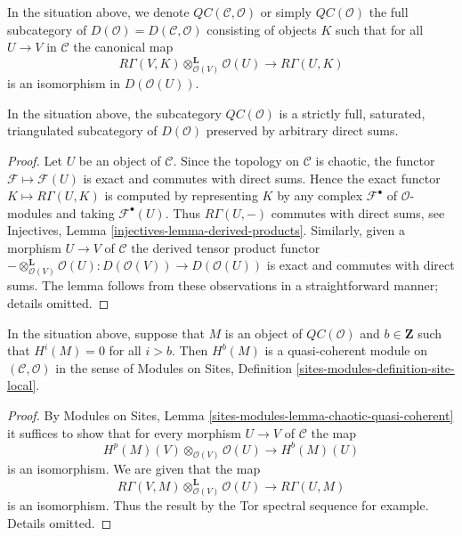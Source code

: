 \begin{definition}
\label{definition-cartesian}
In the situation above, we denote $\mathit{QC}(\mathcal{C}, \mathcal{O})$
or simply {\it $\mathit{QC}(\mathcal{O})$}
the full subcategory of $D(\mathcal{O}) = D(\mathcal{C}, \mathcal{O})$
consisting of objects $K$ such that
for all $U \to V$ in $\mathcal{C}$ the canonical map
$$
R\Gamma(V, K) \otimes_{\mathcal{O}(V)}^\mathbf{L} \mathcal{O}(U)
\longrightarrow
R\Gamma(U, K)
$$
is an isomorphism in $D(\mathcal{O}(U))$.
\end{definition}

\begin{lemma}
\label{lemma-cartesian-good-sub}
In the situation above, the subcategory $\mathit{QC}(\mathcal{O})$ is a
strictly full, saturated, triangulated subcategory of $D(\mathcal{O})$
preserved by arbitrary direct sums.
\end{lemma}

\begin{proof}
Let $U$ be an object of $\mathcal{C}$. Since the topology
on $\mathcal{C}$ is chaotic, the functor $\mathcal{F} \mapsto \mathcal{F}(U)$
is exact and commutes with direct sums. Hence the exact functor
$K \mapsto R\Gamma(U, K)$ is computed by representing $K$ by any complex
$\mathcal{F}^\bullet$ of $\mathcal{O}$-modules and taking
$\mathcal{F}^\bullet(U)$. Thus $R\Gamma(U, -)$ commutes with direct
sums, see Injectives, Lemma \ref{injectives-lemma-derived-products}.
Similarly, given a morphism $U \to V$ of $\mathcal{C}$
the derived tensor product functor
$- \otimes_{\mathcal{O}(V)}^\mathbf{L} \mathcal{O}(U) :
D(\mathcal{O}(V)) \to D(\mathcal{O}(U))$
is exact and commutes with direct sums. The lemma follows
from these observations in a straightforward manner; details omitted.
\end{proof}

\begin{lemma}
\label{lemma-QC-bounded-above}
In the situation above, suppose that $M$ is an object of
$\mathit{QC}(\mathcal{O})$ and $b \in \mathbf{Z}$ such that $H^i(M) = 0$
for all $i > b$. Then $H^b(M)$ is a quasi-coherent module on
$(\mathcal{C}, \mathcal{O})$ in the sense of
Modules on Sites, Definition \ref{sites-modules-definition-site-local}.
\end{lemma}

\begin{proof}
By Modules on Sites, Lemma \ref{sites-modules-lemma-chaotic-quasi-coherent}
it suffices to show that for every morphism $U \to V$ of
$\mathcal{C}$ the map
$$
H^p(M)(V) \otimes_{\mathcal{O}(V)} \mathcal{O}(U) \to H^b(M)(U)
$$
is an isomorphism. We are given that the map
$$
R\Gamma(V, M) \otimes_{\mathcal{O}(V)}^\mathbf{L} \mathcal{O}(U)
\to R\Gamma(U, M)
$$
is an isomorphism. Thus the result by the Tor spectral sequence for example.
Details omitted.
\end{proof}

